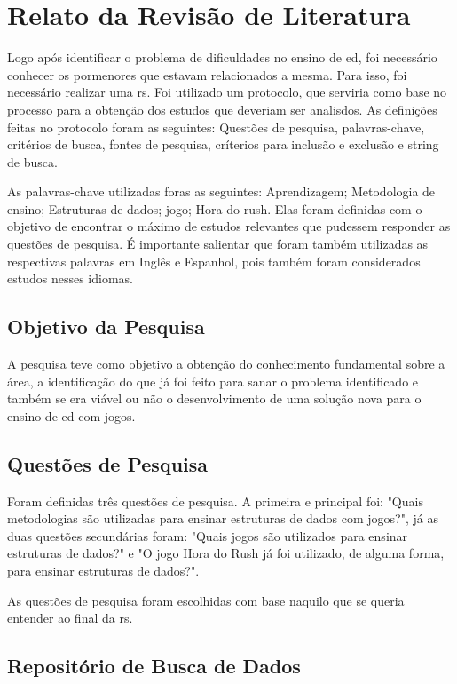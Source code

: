 \documentclass[12pt]{article}
\begin{document}
\section{Relato da Revisão de Literatura}

Logo após identificar o problema de dificuldades no ensino de \gls{ed}, foi necessário conhecer os pormenores que estavam relacionados a mesma. Para isso, foi necessário realizar uma \gls{rs}. Foi utilizado um protocolo, que serviria como base no processo para a obtenção dos estudos que deveriam ser analisdos. As definições feitas no protocolo foram as seguintes: Questões de pesquisa, palavras-chave, critérios de busca, fontes de pesquisa, críterios para inclusão e exclusão e string de busca.

As palavras-chave utilizadas foras as seguintes: Aprendizagem; Metodologia de ensino; Estruturas de dados; jogo; Hora do rush.
Elas foram definidas com o objetivo de encontrar o máximo de estudos relevantes que pudessem responder as questões de pesquisa. É importante salientar que foram também utilizadas as respectivas palavras em Inglês e Espanhol, pois também foram considerados estudos nesses idiomas.

\subsection{Objetivo da Pesquisa}

A pesquisa teve como objetivo a obtenção do conhecimento fundamental sobre a área, a identificação do que já foi feito para sanar o problema identificado e também se era viável ou não o desenvolvimento de uma solução nova para o ensino de \gls{ed} com jogos. 

\subsection{Questões de Pesquisa}

Foram definidas três questões de pesquisa. A primeira e principal foi: "Quais metodologias são utilizadas para ensinar estruturas de dados com jogos?", já as duas questões secundárias foram: "Quais jogos são utilizados para ensinar estruturas de dados?" e "O jogo Hora do Rush já foi utilizado, de alguma forma, para ensinar estruturas de dados?".

As questões de pesquisa foram escolhidas com base naquilo que se queria entender ao final da \gls{rs}.

\subsection{Repositório de Busca de Dados}
\end{document}
